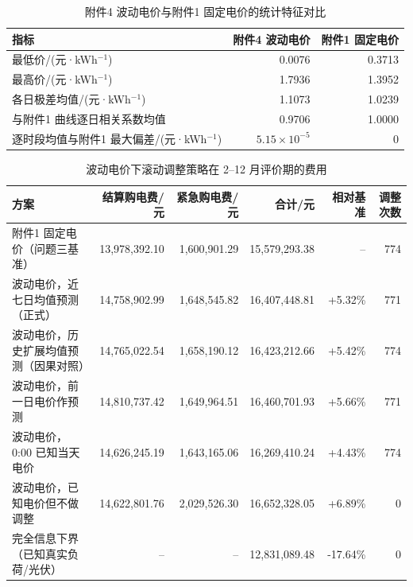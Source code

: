 \begin{table}[H]
  \centering
  \caption{附件4 波动电价与附件1 固定电价的统计特征对比}
  \label{tab:q4-price}
  \small
  \begin{tabular}{lrr}
    \toprule
    指标 & 附件4 波动电价 & 附件1 固定电价 \\
    \midrule
    最低价/(元·kWh$^{-1}$) & 0.0076 & 0.3713 \\
    最高价/(元·kWh$^{-1}$) & 1.7936 & 1.3952 \\
    各日极差均值/(元·kWh$^{-1}$) & 1.1073 & 1.0239 \\
    与附件1 曲线逐日相关系数均值 & 0.9706 & 1.0000 \\
    逐时段均值与附件1 最大偏差/(元·kWh$^{-1}$) & $5.15\times10^{-5}$ & 0 \\
    \bottomrule
  \end{tabular}
\end{table}
\begin{table}[H]
  \centering
  \caption{波动电价下滚动调整策略在 2--12 月评价期的费用}
  \label{tab:q4-3}
  \small
  \begin{tabular}{lrrrrr}
    \toprule
    方案 & 结算购电费/元 & 紧急购电费/元 & 合计/元 & 相对基准 & 调整次数 \\
    \midrule
    附件1 固定电价（问题三基准） & 13,978,392.10 & 1,600,901.29 & 15,579,293.38 & -- & 774 \\
    波动电价，近七日均值预测（正式） & 14,758,902.99 & 1,648,545.82 & 16,407,448.81 & +5.32\% & 771 \\
    波动电价，历史扩展均值预测（因果对照） & 14,765,022.54 & 1,658,190.12 & 16,423,212.66 & +5.42\% & 774 \\
    波动电价，前一日电价作预测 & 14,810,737.42 & 1,649,964.51 & 16,460,701.93 & +5.66\% & 771 \\
    波动电价，0:00 已知当天电价 & 14,626,245.19 & 1,643,165.06 & 16,269,410.24 & +4.43\% & 774 \\
    波动电价，已知电价但不做调整 & 14,622,801.76 & 2,029,526.30 & 16,652,328.05 & +6.89\% & 0 \\
    \midrule
    完全信息下界（已知真实负荷/光伏） & -- & -- & 12,831,089.48 & -17.64\% & 0 \\
    \bottomrule
  \end{tabular}
\end{table}


